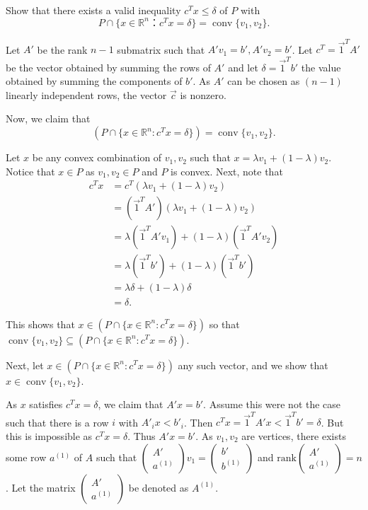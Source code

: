 \documentclass[11pt]{article}
\DeclareMathOperator{\conv}{conv}
\newcommand{\setR}{\mathbb{R}}
\newcommand{\rank}{\mathrm{rank}}
\begin{document}
\begin{enumerate}[1)]
Show that there exists a valid inequality $c^Tx ≤ δ$ of $P$ with
\begin{displaymath}
P ∩ \{ x ∈ ℝ^n ： c^Tx = δ \} = \conv\{v_1,v_2\}. 
\end{displaymath}



\begin{solution}
Let $A'$ be the rank $n-1$ submatrix such that $A'v_1 = b', A'v_2 = b'$. Let $c^T = \vec{1}^TA'$ be the vector obtained by summing the rows of $A'$ and let $\delta = \vec{1}^Tb'$ the value obtained by summing the components of $b'$. As $A'$ can be chosen as $(n-1)$ linearly independent rows, the vector $\vec{c}$ is nonzero. 

Now, we claim that $$(P \cap \{x \in \setR^n: c^Tx = \delta\}) = \conv\{v_1, v_2\}.$$

Let $x$ be any convex combination of $v_1, v_2$ such that $x = \lambda v_1 + (1 - \lambda)v_2$. Notice that $x \in P$ as $v_1, v_2 \in P$ and $P$ is convex. Next, note that
\begin{align*}
c^Tx & = c^T ( \lambda v_1 + (1 - \lambda)v_2) \\
& = (\vec{1}^TA') (\lambda v_1 + (1 - \lambda)v_2) \\
& = \lambda (\vec{1}^T A' v_1) + (1-\lambda)(\vec{1}^TA' v_2) \\
& = \lambda (\vec{1}^T b') + (1-\lambda)(\vec{1}^T b') \\
& = \lambda \delta + (1-\lambda)\delta \\
& = \delta. 
\end{align*}

This shows that $x \in (P \cap \{x \in \setR^n: c^Tx = \delta\})$ so that $ \conv\{v_1, v_2\} \subseteq (P \cap \{x \in \setR^n: c^Tx = \delta\})$. 


Next, let $x \in  (P \cap \{x \in \setR^n: c^Tx = \delta\})$ any such vector, and we show that $x \in  \conv\{v_1, v_2\}$. 

As $x$ satisfies $c^Tx = \delta$, we claim that $A'x = b'$. Assume this were not the case such that there is a row $i$ with $A'_i x < b'_i$. Then $c^Tx = \vec{1}^T A' x < \vec{1}^T b' = \delta$. But this is impossible as $c^Tx = \delta$. Thus $A'x = b'$. As $v_1, v_2$ are vertices, there exists some row $a^{(1)}$ of $A$ such that $\begin{pmatrix} A' \\ a^{(1)} \end{pmatrix} v_1 = \begin{pmatrix} b' \\ b^{(1)} \end{pmatrix}$ and $\rank \begin{pmatrix} A' \\ a^{(1)}\end{pmatrix} = n$. Let the matrix $\begin{pmatrix} A' \\ a^{(1)} \end{pmatrix}$ be denoted as $A^{(1)}$. 


\end{solution}
\end{enumerate}
\end{document}
